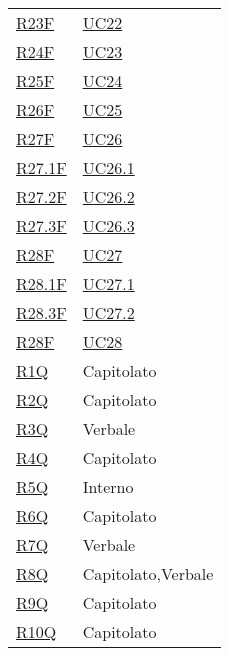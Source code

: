 \begin{center}
\begin{longtable}[!h]{p{50px} p{50px}}
        \hyperref[tab:RequisitiFunzionali]{R23F}     & \hyperref[sec:UC22]{UC22}     \\
        \hyperref[tab:RequisitiFunzionali]{R24F}     & \hyperref[sec:UC23]{UC23}     \\
        \hyperref[tab:RequisitiFunzionali]{R25F}     & \hyperref[sec:UC24]{UC24}     \\
        \hyperref[tab:RequisitiFunzionali]{R26F}     & \hyperref[sec:UC25]{UC25}     \\
        \hyperref[tab:RequisitiFunzionali]{R27F}     & \hyperref[sec:UC26]{UC26}     \\
        \hyperref[tab:RequisitiFunzionali]{R27.1F}   & \hyperref[sec:UC26.1]{UC26.1} \\
        \hyperref[tab:RequisitiFunzionali]{R27.2F}   & \hyperref[sec:UC26.2]{UC26.2} \\
        \hyperref[tab:RequisitiFunzionali]{R27.3F}   & \hyperref[sec:UC26.3]{UC26.3} \\
        \hyperref[tab:RequisitiFunzionali]{R28F}     & \hyperref[sec:UC27]{UC27}     \\
        \hyperref[tab:RequisitiFunzionali]{R28.1F}   & \hyperref[sec:UC27.1]{UC27.1} \\
        \hyperref[tab:RequisitiFunzionali]{R28.3F}   & \hyperref[sec:UC27.2]{UC27.2} \\
        \hyperref[tab:RequisitiFunzionali]{R28F}     & \hyperref[sec:UC28]{UC28}     \\

        \hyperref[tab:RequisitiQualita]{R1Q}         & Capitolato                    \\
        \hyperref[tab:RequisitiQualita]{R2Q}         & Capitolato                    \\
        \hyperref[tab:RequisitiQualita]{R3Q}         & Verbale                       \\
        \hyperref[tab:RequisitiQualita]{R4Q}         & Capitolato                    \\
        \hyperref[tab:RequisitiQualita]{R5Q}         & Interno                       \\
        \hyperref[tab:RequisitiQualita]{R6Q}         & Capitolato                    \\
        \hyperref[tab:RequisitiQualita]{R7Q}         & Verbale                       \\
        \hyperref[tab:RequisitiQualita]{R8Q}         & Capitolato,\newline Verbale   \\
        \hyperref[tab:RequisitiQualita]{R9Q}         & Capitolato                    \\
        \hyperref[tab:RequisitiQualita]{R10Q}        & Capitolato                    \\


\end{longtable}
\end{center}
